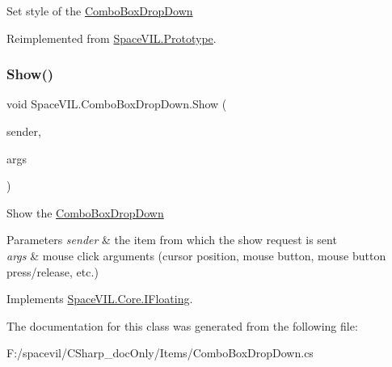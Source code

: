 Set style of the \mbox{\hyperlink{class_space_v_i_l_1_1_combo_box_drop_down}{Combo\+Box\+Drop\+Down}} 



Reimplemented from \mbox{\hyperlink{class_space_v_i_l_1_1_prototype_ae96644a6ace490afb376fb542161e541}{Space\+V\+I\+L.\+Prototype}}.

\mbox{\label{class_space_v_i_l_1_1_combo_box_drop_down_a03c88461af5f952883e306c1e5da555b}} 
\subsubsection{\texorpdfstring{Show()}{Show()}}
{\footnotesize\ttfamily void Space\+V\+I\+L.\+Combo\+Box\+Drop\+Down.\+Show (\begin{DoxyParamCaption}\item[{\mbox{\hyperlink{interface_space_v_i_l_1_1_core_1_1_i_item}{I\+Item}}}]{sender,  }\item[{\mbox{\hyperlink{class_space_v_i_l_1_1_core_1_1_mouse_args}{Mouse\+Args}}}]{args }\end{DoxyParamCaption})}



Show the \mbox{\hyperlink{class_space_v_i_l_1_1_combo_box_drop_down}{Combo\+Box\+Drop\+Down}} 


\begin{DoxyParams}{Parameters}
{\em sender} & the item from which the show request is sent \\
\hline
{\em args} & mouse click arguments (cursor position, mouse button, mouse button press/release, etc.) \\
\hline
\end{DoxyParams}


Implements \mbox{\hyperlink{interface_space_v_i_l_1_1_core_1_1_i_floating}{Space\+V\+I\+L.\+Core.\+I\+Floating}}.



The documentation for this class was generated from the following file\+:\begin{DoxyCompactItemize}
\item 
F\+:/spacevil/\+C\+Sharp\+\_\+doc\+Only/\+Items/Combo\+Box\+Drop\+Down.\+cs\end{DoxyCompactItemize}
